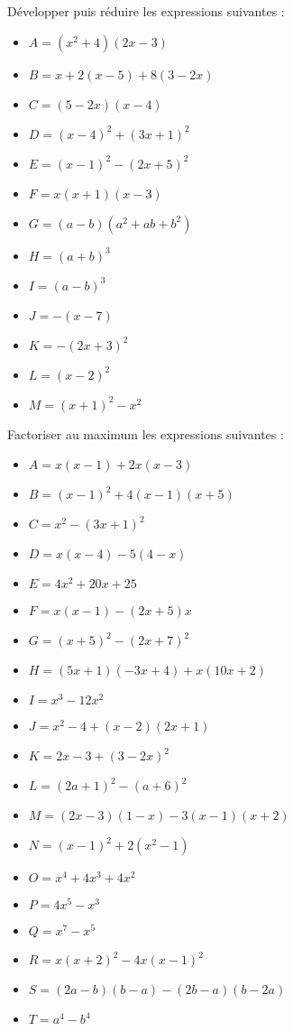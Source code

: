 \begin{exo}
 D\'evelopper puis r\'eduire les expressions suivantes :
\vspace{-1em}\begin{multicols}{3}\begin{itemize}
 \item $A=(x^2+4)(2x-3)$
 \item $B=x+2(x-5)+8(3-2x)$
 \item $C=(5-2x)(x-4)$
 \item $D=(x-4)^2+(3x+1)^2$
 \item $E=(x-1)^2-(2x+5)^2$
 \item $F=x(x+1)(x-3)$
 \item $G=(a-b)(a^2+ab+b^2)$
 \item $H=(a+b)^3$
 \item $I=(a-b)^3$
 \item $J=-(x-7)$
 \item $K=-(2x+3)^2$
 \item $L=(x-2)^2$
 \item $M=(x+1)^2-x^2$
\end{itemize} \end{multicols}\vspace{-1em}
\end{exo}


\begin{exo}
 Factoriser au maximum les expressions suivantes :
\vspace{-1em}\begin{multicols}{2}\begin{itemize}
 \item $A=x(x-1)+2x(x-3)$
 \item $B=(x-1)^2+4(x-1)(x+5)$
 \item $C=x^2-(3x+1)^2$
 \item $D=x(x-4)-5(4-x)$
 \item $E=4x^2+20x+25$
 \item $F=x(x-1)-(2x+5)x$
 \item $G=(x+5)^2-(2x+7)^2$
 \item $H=(5x+1)(-3x+4)+x(10x+2)$
 \item $I=x^3-12x^2$
 \item $J=x^2-4+(x-2)(2x+1)$
 \item $K=2x-3+(3-2x)^2$
 \item $L=(2a+1)^2-(a+6)^2$
 \item $M=(2x-3)(1-x)-3(x-1)(x+2)$
 \item $N=(x-1)^2+2(x^2-1)$
 \item $O=x^4+4x^3+4x^2$
 \item $P=4x^5-x^3$
 \item $Q=x^7-x^5$
 \item $R=x(x+2)^2-4x(x-1)^2$
 \item $S=(2a-b)(b-a)-(2b-a)(b-2a)$
 \item $T=a^4-b^4$
\end{itemize} \end{multicols}\vspace{-1em}
\end{exo}





